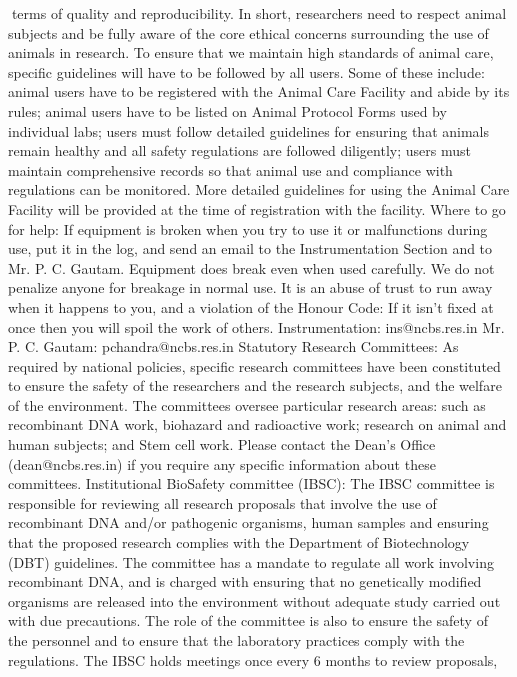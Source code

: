 \documentclass[a4paper,10pt]{article}
\begin{document}
terms of quality and reproducibility. In short, researchers need to respect animal subjects
and be fully aware of the core ethical concerns surrounding the use of animals in research.
To ensure that we maintain high standards of animal care, specific guidelines will have to be
followed by all users. Some of these include: animal users have to be registered with the
Animal Care Facility and abide by its rules; animal users have to be listed on Animal
Protocol Forms used by individual labs; users must follow detailed guidelines for ensuring
that animals remain healthy and all safety regulations are followed diligently; users must
maintain comprehensive records so that animal use and compliance with regulations can be
monitored. More detailed guidelines for using the Animal Care Facility will be provided at
the time of registration with the facility.
Where to go for help: If equipment is broken when you try to use it or malfunctions during
use, put it in the log, and send an email to the Instrumentation Section and to Mr. P. C.
Gautam. Equipment does break even when used carefully. We do not penalize anyone for
breakage in normal use. It is an abuse of trust to run away when it happens to you, and a
violation of the Honour Code: If it isn't fixed at once then you will spoil the work of others.
Instrumentation: ins@ncbs.res.in
Mr. P. C. Gautam: pchandra@ncbs.res.in
Statutory Research Committees: As required by national policies, specific research committees have been
constituted to ensure the safety of the researchers and the research subjects, and the welfare of the
environment. The committees oversee particular research areas: such as recombinant DNA work, biohazard
and radioactive work; research on animal and human subjects; and Stem cell work. Please contact the Dean’s
Office (dean@ncbs.res.in) if you require any specific information about these committees.
Institutional BioSafety committee (IBSC): The IBSC committee is responsible for reviewing all research
proposals that involve the use of recombinant DNA and/or pathogenic organisms, human samples and ensuring
that the proposed research complies with the Department of Biotechnology (DBT) guidelines. The committee
has a mandate to regulate all work involving recombinant DNA, and is charged with ensuring that no genetically
modified organisms are released into the environment without adequate study carried out with due precautions.
The role of the committee is also to ensure the safety of the personnel and to ensure that the laboratory
practices comply with the regulations. The IBSC holds meetings once every 6 months to review proposals,
\end{document}
